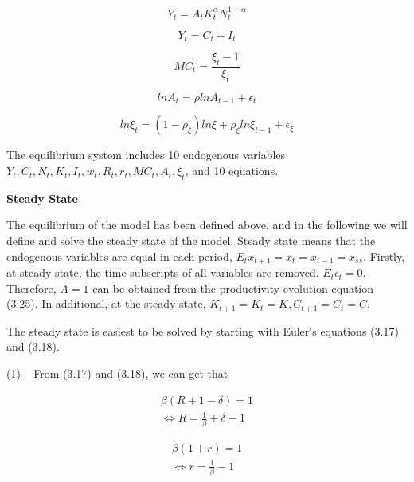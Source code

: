 \documentclass[10pt,math=newtx,citestyle=gb7714-2015,bibstyle=gb7714-2015]{elegantbook}
\begin{document}
	\begin{equation}\label{label}
		Y_t=A_tK_t^{\alpha}N_t^{1-\alpha}
	\end{equation}
	
	\begin{equation}\label{label}
		Y_t=C_t+I_t
	\end{equation}
	
	\begin{equation}\label{label}
		MC_t=\frac{\xi_t-1}{\xi_t}
	\end{equation}
	
	\begin{equation}\label{label}
		lnA_t=\rho lnA_{t-1}+\epsilon_t
	\end{equation}
	
	\begin{equation}\label{label}
		ln\xi _t=(1-\rho_{\xi})ln\xi+\rho_{\xi} ln\xi_{t-1}+\epsilon_{\xi}
	\end{equation}
	
	The equilibrium system includes 10 endogenous variables $Y_t,C_t,N_t,K_t,I_t,w_t,R_t,r_t,MC_t,A_t,\xi_t$, and 10 equations.
	
	
	\textbf{Steady State}
	
The equilibrium of the model has been defined above, and in the following we will define and solve the steady state of the model. Steady state means that the endogenous variables are equal in each period, $E_tx_{t+1}=x_t=x_{t-1}=x_{ss}$. Firstly, at steady state, the time subscripts of all variables are removed. $E_t\epsilon_t=0$. Therefore, $A=1$ can be obtained from the productivity evolution equation (3.25). In additional, at the steady state, $K_{t+1}=K_t=K, C_{t+1}=C_t=C$.

The steady state is easiest to be solved by starting with Euler's equations (3.17) and (3.18).

(1) ~ From (3.17) and (3.18), we can get that
	
	\begin{equation}\label{label}
		\begin{split}
			\beta(R+1-\delta)=1\\
			\Leftrightarrow R=\frac{1}{\beta}+\delta-1
		\end{split}
	\end{equation}
	
	\begin{equation}\label{label}
		\begin{split}
			\beta(1+r)=1\\
			\Leftrightarrow r=\frac{1}{\beta}-1
		\end{split}
	\end{equation}
	
\end{document}
